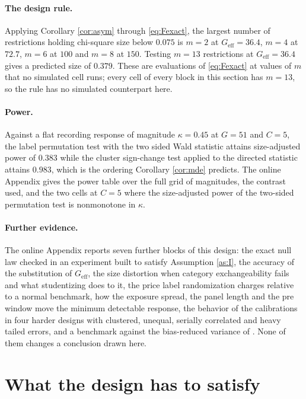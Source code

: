\documentclass[12pt]{article}
\theoremstyle{definition}
\numberwithin{equation}{section}
\begin{document}
\paragraph{The design rule.} Applying Corollary \ref{cor:asym} through
\eqref{eq:Fexact}, the largest number of restrictions holding chi-square size
below $0.075$ is $m = 2$ at $G_{\mathrm{eff}} = 36.4$, $m = 4$ at $72.7$, $m =
6$ at $100$ and $m = 8$ at $150$. Testing $m = 13$ restrictions at
$G_{\mathrm{eff}} = 36.4$ gives a predicted size of $0.379$. These are
evaluations of \eqref{eq:Fexact} at values of $m$ that no simulated cell runs;
every cell of every block in this section has $m = 13$, so the rule has no
simulated counterpart here.

\paragraph{Power.} Against a flat recording response of magnitude
$\kappa = 0.45$ at $G = 51$ and $C = 5$, the label permutation test with the two
sided Wald statistic attains size-adjusted power of $0.383$ while the cluster
sign-change test applied to the directed statistic attains $0.983$, which is the
ordering Corollary \ref{cor:mde} predicts. The online Appendix gives the power
table over the full grid of magnitudes, the contrast used, and the two cells at
$C = 5$ where the size-adjusted power of the two-sided permutation test is
nonmonotone in $\kappa$.

\paragraph{Further evidence.} The online Appendix reports seven further blocks of this design: the exact null law checked in an experiment built to satisfy Assumption \ref{as:I}, the accuracy of the substitution of $G_{\mathrm{eff}}$, the size distortion when category exchangeability fails and what studentizing does to it, the price label randomization charges relative to a normal benchmark, how the exposure spread, the panel length and the pre window move the minimum detectable response, the behavior of the calibrations in four harder designs with clustered, unequal, serially correlated and heavy tailed errors, and a benchmark against the bias-reduced variance of \citet{bell2002bias}. None of them changes a conclusion drawn here.


\section{What the design has to satisfy}
\label{sec:designcalc}
\end{document}

